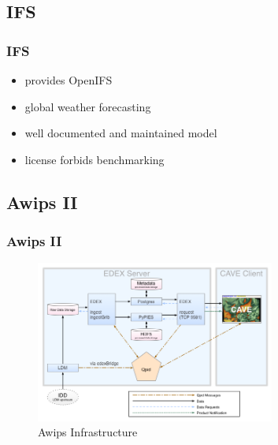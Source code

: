 \documentclass[compress]{beamer}
\begin{document}
\subsection{IFS}
\begin{frame}
	\frametitle{IFS}
	\begin{itemize}
	    \item provides OpenIFS \cite{ifs}
	    \item global weather forecasting
		\item well documented and maintained model
		\item license forbids benchmarking
	\end{itemize}
\end{frame}

\subsection{Awips II}
\begin{frame}
    \frametitle{Awips II}
    \begin{center}
    	\begin{figure}
			\includegraphics[width=0.7\textwidth]{gfx/awipsII.png}
      	  	\caption[]{Awips Infrastructure \cite{Uni01}}
		\end{figure}
	\end{center}
\end{frame}
\end{document}
